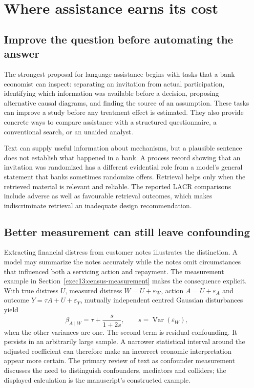 \chapter{Where assistance earns its cost}
\label{reading:assistance-conclusions}

\section{Improve the question before automating the answer}

The strongest proposal for language assistance begins with tasks that a bank
economist can inspect: separating an invitation from actual participation,
identifying which information was available before a decision, proposing
alternative causal diagrams, and finding the source of an assumption. These
tasks can improve a study before any treatment effect is estimated. They also
provide concrete ways to compare assistance with a structured questionnaire,
a conventional search, or an unaided analyst.~\citep{v12_la_2305_00050,v12_la_2606_23608}

Text can supply useful information about mechanisms, but a plausible sentence
does not establish what happened in a bank. A process record showing that an
invitation was randomized has a different evidential role from a model's
general statement that banks sometimes randomize offers. Retrieval helps only
when the retrieved material is relevant and reliable. The reported LACR
comparisons include adverse as well as favourable retrieval outcomes, which
makes indiscriminate retrieval an inadequate design recommendation.
\citep{v12_la_2402_15301}

\section{Better measurement can still leave confounding}

Extracting financial distress from customer notes illustrates the distinction.
A model may summarize the notes accurately while the notes omit circumstances
that influenced both a servicing action and repayment. The measurement example
in Section~\ref{exec13:census-measurement} makes the consequence explicit.
With true distress $U$, measured distress $W=U+\varepsilon_W$, action
$A=U+\varepsilon_A$ and outcome $Y=\tau A+U+\varepsilon_Y$, mutually
independent centred Gaussian disturbances yield
\[
 \beta_{A\mid W}=\tau+\frac{s}{1+2s},\qquad
 s=\operatorname{Var}(\varepsilon_W),
\]
when the other variances are one. The second term is residual confounding.
It persists in an arbitrarily large sample. A narrower statistical interval
around the adjusted coefficient can therefore make an incorrect economic
interpretation appear more certain. The primary review of text as confounder
measurement discusses the need to distinguish confounders, mediators and
colliders; the displayed calculation is the manuscript's constructed example.
\citep{exec13_census_text_review_arxiv}

